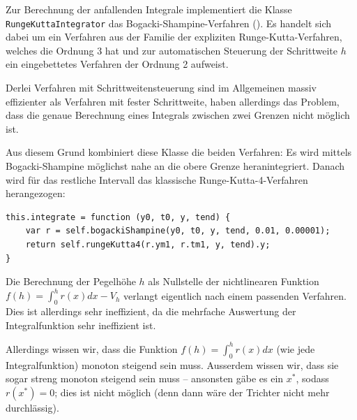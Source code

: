 \documentclass[11pt]{scrreprt} %
\theoremstyle{definition}
\begin{document}
Zur Berechnung der anfallenden Integrale implementiert die Klasse {\tt RungeKuttaIntegrator} das Bogacki-Shampine-Verfahren (\cite{wiki:bogackiShampine}). Es handelt sich dabei um ein Verfahren aus der Familie der expliziten Runge-Kutta-Verfahren, welches die Ordnung 3 hat und zur automatischen Steuerung der Schrittweite $h$ ein eingebettetes Verfahren der Ordnung 2 aufweist.

Derlei Verfahren mit Schrittweitensteuerung sind im Allgemeinen massiv effizienter als Verfahren mit fester Schrittweite, haben allerdings das Problem, dass die genaue Berechnung eines Integrals zwischen zwei Grenzen nicht möglich ist.

Aus diesem Grund kombiniert diese Klasse die beiden Verfahren: Es wird mittels Bogacki-Shampine möglichst nahe an die obere Grenze heranintegriert. Danach wird für das restliche Intervall das klassische Runge-Kutta-4-Verfahren herangezogen:

\begin{lstlisting}
this.integrate = function (y0, t0, y, tend) {
	var r = self.bogackiShampine(y0, t0, y, tend, 0.01, 0.00001);
	return self.rungeKutta4(r.ym1, r.tm1, y, tend).y;
}
\end{lstlisting}

Die Berechnung der Pegelhöhe $h$ als Nullstelle der nichtlinearen Funktion $f(h) = \int_0^h r(x) dx - V_h$ verlangt eigentlich nach einem passenden Verfahren. Dies ist allerdings sehr ineffizient, da die mehrfache Auswertung der Integralfunktion sehr ineffizient ist.

Allerdings wissen wir, dass die Funktion  $f(h) = \int_0^h r(x) dx$ (wie jede Integralfunktion) monoton steigend sein muss. Ausserdem wissen wir, dass sie sogar streng monoton steigend sein muss -- ansonsten gäbe es ein $x^*$, sodass $r(x^*) = 0$; dies ist nicht möglich (denn dann wäre der Trichter nicht mehr durchlässig).
\end{document}
